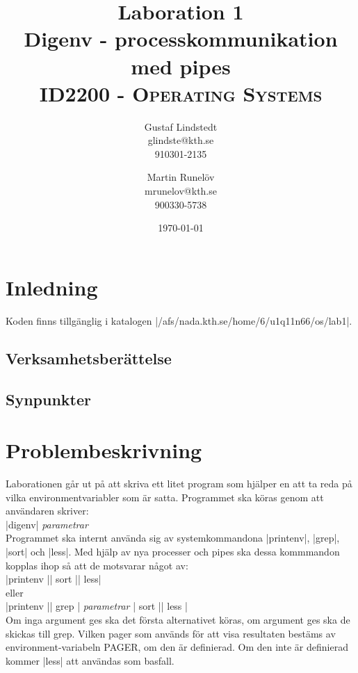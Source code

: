 \documentclass[paper=a4, fontsize=11pt]{scrartcl} %
\title{ 
\huge Laboration 1 \\ Digenv - processkommunikation med pipes \\ %
\vspace{10pt}
\normalfont \normalsize 
\textsc{ID2200 - Operating Systems } \\ [25pt] %
}
\author{Gustaf Lindstedt \\ glindste@kth.se \\ 910301-2135 \and Martin Runelöv \\ mrunelov@kth.se \\ 900330-5738}
\date{\vspace{8pt}\normalsize\today} %
\numberwithin{equation}{section} %
\numberwithin{figure}{section} %
\numberwithin{table}{section} %
\begin{document}
\maketitle

\section{Inledning}

Koden finns tillgänglig i katalogen |/afs/nada.kth.se/home/6/u1q11n66/os/lab1|.\\



\subsection{Verksamhetsberättelse}


\subsection{Synpunkter}



\section{Problembeskrivning}
Laborationen går ut på att skriva ett litet program som hjälper en att ta reda
på vilka environmentvariabler som är satta.
Programmet ska köras genom att användaren skriver:
\\
|digenv| \emph{parametrar}
\\
Programmet ska internt använda sig av systemkommandona |printenv|, |grep|,
|sort| och |less|.
Med hjälp av nya processer och pipes ska dessa kommmandon kopplas ihop
så att de motsvarar något av:
\\
|printenv |\textbar| sort |\textbar| less| \\ eller \\
|printenv |\textbar| grep | \emph{parametrar} \textbar | sort |\textbar| less |
\\
Om inga argument ges ska det första alternativet köras, om argument ges ska
de skickas till grep.
Vilken pager som används för att visa resultaten bestäms av
environment-variabeln PAGER, om den är definierad.
Om den inte är definierad kommer |less| att användas som basfall.
\end{document}
